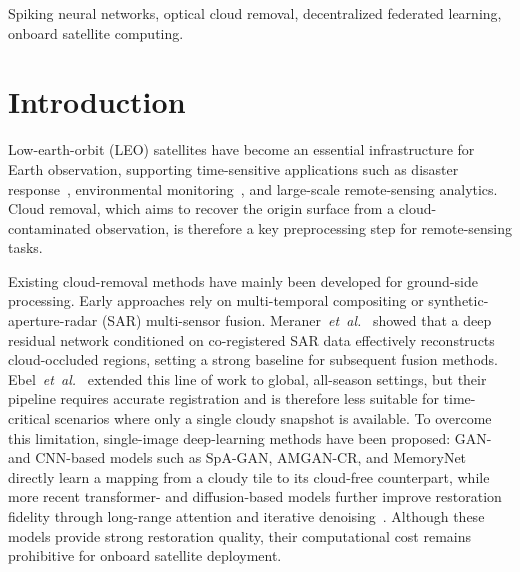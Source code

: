 \documentclass[conference]{IEEEtran}
\newcommand{\OrbitALIF}{\textsc{OrbitALIF}}
\begin{document}
\begin{abstract}

\end{abstract}

\begin{IEEEkeywords}
Spiking neural networks, optical cloud removal, decentralized
federated learning, onboard satellite computing.
\end{IEEEkeywords}

\section{Introduction}\label{sec:intro}

Low-earth-orbit (LEO) satellites have become an essential
infrastructure for Earth observation, supporting time-sensitive
applications such as disaster response~\cite{ref:earthobs2},
environmental monitoring~\cite{ref:earthobs1}, and large-scale
remote-sensing analytics.
Cloud removal, which aims to recover the origin surface from a
cloud-contaminated observation, is therefore a key preprocessing step
for remote-sensing tasks.

Existing cloud-removal methods have mainly been developed for
ground-side processing. Early approaches rely on multi-temporal
compositing or synthetic-aperture-radar (SAR) multi-sensor fusion.
Meraner~\emph{et~al.}~\cite{ref:meraner2020} showed that a deep
residual network conditioned on co-registered SAR data effectively
reconstructs cloud-occluded regions, setting a strong baseline for
subsequent fusion methods. Ebel~\emph{et~al.}~\cite{ref:ebel2021multisensor}
extended this line of work to global, all-season settings, but their
pipeline requires accurate registration and is therefore less suitable
for time-critical scenarios where only a single cloudy snapshot is
available. To overcome this limitation, single-image deep-learning
methods have been proposed: GAN- and CNN-based models such as
SpA-GAN, AMGAN-CR, and MemoryNet directly learn a mapping from a
cloudy tile to its cloud-free counterpart, while more recent
transformer- and diffusion-based models further improve restoration
fidelity through long-range attention and iterative
denoising~\cite{ref:cuhkcr}. Although these models provide strong
restoration quality, their computational cost remains prohibitive for
onboard satellite deployment.
\end{document}
